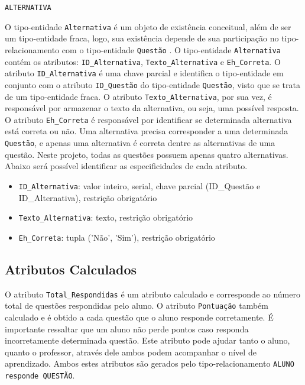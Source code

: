 \documentclass[12pt,a4paper]{article}
\begin{document}
\vspace{0.5cm}
\begin{center}
    \texttt{ALTERNATIVA}
\end{center}

O tipo-entidade \texttt{Alternativa} é um objeto de existência conceitual, além de ser um tipo-entidade fraca, logo, sua existência depende de sua participação no tipo-relacionamento com o tipo-entidade \texttt{Questão} . O tipo-entidade \texttt{Alternativa} contém os atributos: \texttt{ID\_Alternativa}, \texttt{Texto\_Alternativa} e \texttt{Eh\_Correta}. O atributo \texttt{ID\_Alternativa} é uma chave parcial e identifica o tipo-entidade em conjunto com o atributo \texttt{ID\_Questão} do tipo-entidade \texttt{Questão}, visto que se trata de um tipo-entidade fraca. O atributo \texttt{Texto\_Alternativa}, por sua vez, é responsável por armazenar o texto da alternativa, ou seja, uma possível resposta.\\

O atributo \texttt{Eh\_Correta} é responsável por identificar se determinada alternativa está correta ou não. Uma alternativa precisa corresponder a uma determinada \texttt{Questão}, e apenas uma alternativa é correta dentre as alternativas de uma questão. Neste projeto, todas as questões possuem apenas quatro alternativas. Abaixo será possível identificar as especificidades de cada atributo. \\

\begin{itemize}
    \item \texttt{ID\_Alternativa}: valor inteiro, serial, chave parcial (ID\_Questão e ID\_Alternativa), restrição obrigatório
    \item \texttt{Texto\_Alternativa}: texto, restrição obrigatório
    \item \texttt{Eh\_Correta}: tupla ('Não', 'Sim'), restrição obrigatório
\end{itemize}

\subsection{Atributos Calculados}

O atributo {\texttt{Total\_Respondidas}} é um atributo calculado e corresponde ao número total de questões respondidas pelo aluno. O atributo {\texttt{Pontuação}} também calculado e é obtido a cada questão que o aluno responde corretamente. É importante ressaltar que um aluno não perde pontos caso responda incorretamente determinada questão. Este atributo pode ajudar tanto o aluno, quanto o professor, através dele ambos podem acompanhar o nível de aprendizado. Ambos estes atributos são gerados pelo tipo-relacionamento \texttt{ALUNO responde QUESTÃO}.\\
\end{document}
